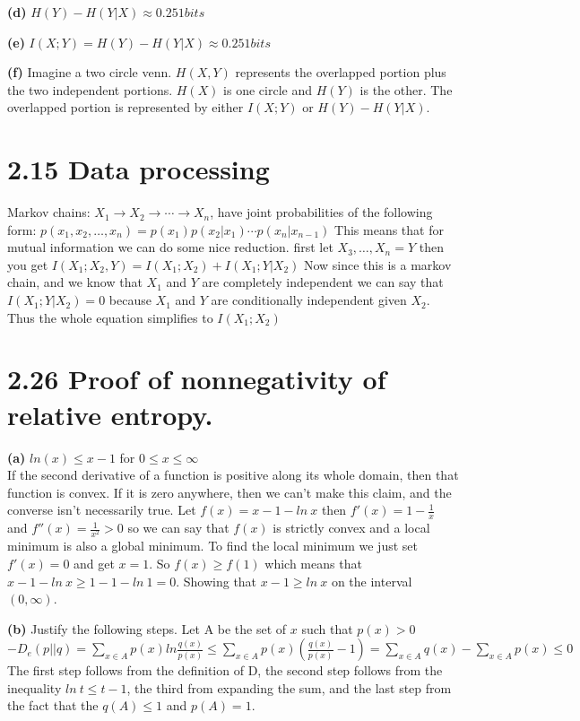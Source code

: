 \documentclass[10pt]{article}
\begin{document}
\begin{tiny}
\begin{multicols}{3}
\textbf{(d)} \(H(Y) - H(Y|X) \approx 0.251 bits\)
            	
\textbf{(e)} \( I(X;Y) =H(Y) - H(Y|X) \approx 0.251 bits
\)
		
\textbf{(f)}  Imagine a two circle venn. $H(X,Y)$ represents the overlapped portion plus the two independent portions. $H(X)$ is one circle and $H(Y)$ is the other. The overlapped portion is represented by either $I(X;Y)$ or $H(Y)-H(Y|X)$.
          
\section*{2.15 Data processing} Markov chains: $X_{1}\rightarrow X_{2}\rightarrow \cdots \rightarrow X_{n}$, have joint probabilities of the following form: 
\(
p(x_{1},x_{2},\ldots,x_{n})=p(x_{1})p(x_{2}|x_{1})\cdots p(x_{n}|x_{n-1})
\)
This means that for mutual information we can do some nice reduction.
first let \( X_{3},\ldots,X_{n} = Y\) then you get \(
I(X_{1};X_{2},Y) = I(X_{1};X_{2})+I(X_{1};Y|X_{2})  \)
Now since this is a markov chain, and we know that $X_{1}$ and $Y$ are completely independent
we can say that $I(X_{1};Y|X_{2})=0$ because $X_1$ and $Y$ are conditionally independent given $X_2$. 
Thus the whole equation simplifies to $I(X_{1};X_{2})$

\section*{2.26 Proof of nonnegativity of relative entropy.}
\textbf{(a)} $ln(x) \leq x-1$ for $0\leq x \leq \infty$\\
If the second derivative of a function is positive along its whole domain, 
then that function is convex. 
If it is zero anywhere, then we can't make this claim, 
and the converse isn't necessarily true.
Let \(f(x)=x-1-ln\ x \) then 
\(
f'(x)= 1-\frac{1}{x}\) and \(
f''(x)=\frac{1}{x^2} > 0
\)
so we can say that $f(x)$ is strictly convex and a local minimum is also a global minimum. 
To find the local minimum we just set $f'(x)=0$ and get $x=1$. 
So $f(x) \geq f(1)$ which means that $x-1-ln\ x \geq 1-1-ln\ 1 = 0$. 
Showing that $x-1 \geq ln\ x$ on the interval $(0,\infty)$.
				 
\textbf{(b)} Justify the following steps. 
Let A be the set of $x$ such that $p(x) > 0$
\(
-D_e(p||q)=\sum_{x\in A} p(x) ln \frac{q(x)}{p(x)}
\leq \sum_{x\in A} p(x)\left( \frac{q(x)}{p(x)}-1\right)
=\sum_{x\in A} q(x) - \sum_{x\in A} p(x)
\leq 0
\)
The first step follows from the definition of D, the second step follows from the inequality $ln\ t \leq t - 1$, the third from expanding the sum, and the last step from the fact that the $q(A) \leq 1$ and $p(A)=1$.
				

\end{multicols}
\end{tiny}
\end{document}

